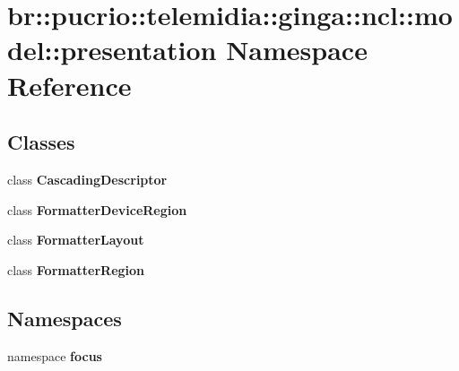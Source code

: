 \section{br::pucrio::telemidia::ginga::ncl::model::presentation Namespace Reference}
\label{namespacebr_1_1pucrio_1_1telemidia_1_1ginga_1_1ncl_1_1model_1_1presentation}


\subsection*{Classes}
\begin{CompactItemize}
\item 
class {\bf CascadingDescriptor}
\item 
class {\bf FormatterDeviceRegion}
\item 
class {\bf FormatterLayout}
\item 
class {\bf FormatterRegion}
\end{CompactItemize}
\subsection*{Namespaces}
\begin{CompactItemize}
\item 
namespace {\bf focus}
\end{CompactItemize}
